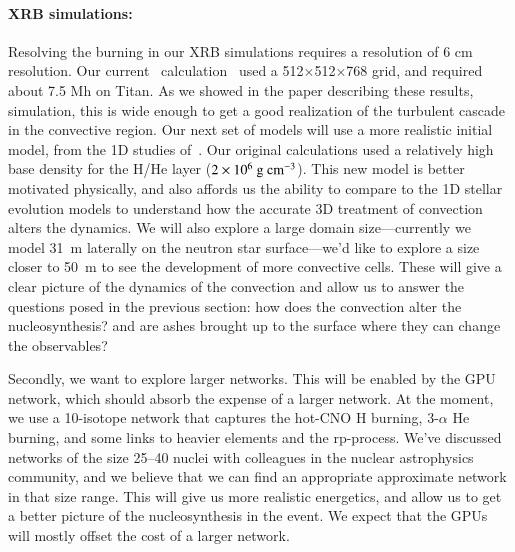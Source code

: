 \paragraph{XRB simulations: } Resolving the burning in our XRB simulations requires
a resolution of 6 cm resolution.  Our current
\maestro\ calculation~\cite{xrb-3d} used a 512$\times$512$\times$768
grid, and required about 7.5 Mh on Titan.  As we showed in the paper
describing these results, simulation, this is wide enough to get a
good realization of the turbulent cascade in the convective region.
Our next set of models will use a more realistic initial model, from
the 1D studies of~\cite{woosley:2004}.  Our original calculations used
a relatively high base density for the H/He layer ($2\times
10^6~{\mathrm{g~cm^{-3}}}$).  This new model is better motivated physically, and also
affords us the ability to compare to the 1D stellar evolution models
to understand how the accurate 3D treatment of convection alters the
dynamics.  We will also explore a large domain size---currently we
model 31~m laterally on the neutron star surface---we'd like to
explore a size closer to 50~m to see the development of more
convective cells.  These will give a clear picture of the dynamics of
the convection and allow us to answer the questions posed in the
previous section: how does the convection alter the nucleosynthesis?
and are ashes brought up to the surface where they can change the
observables?

Secondly, we want to explore larger networks.  This will be enabled by
the GPU network, which should absorb the expense of a larger network.
At the moment, we use a 10-isotope network that captures the hot-CNO H
burning, 3-$\alpha$ He burning, and some links to heavier elements and
the rp-process.  We've discussed networks of the size 25--40 nuclei
with colleagues in the nuclear astrophysics community, and we believe
that we can find an appropriate approximate network in that size
range.  This will give us more realistic energetics, and allow us to
get a better picture of the nucleosynthesis in the event.  We expect that
the GPUs will mostly offset the cost of a larger network.

